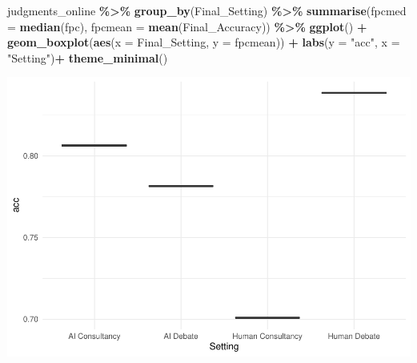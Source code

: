 \documentclass[
]{article}
\newenvironment{Shaded}{\begin{snugshade}}{\end{snugshade}}
\newcommand{\AttributeTok}[1]{\textcolor[rgb]{0.13,0.29,0.53}{#1}}
\newcommand{\FunctionTok}[1]{\textcolor[rgb]{0.13,0.29,0.53}{\textbf{#1}}}
\newcommand{\NormalTok}[1]{#1}
\newcommand{\SpecialCharTok}[1]{\textcolor[rgb]{0.81,0.36,0.00}{\textbf{#1}}}
\newcommand{\StringTok}[1]{\textcolor[rgb]{0.31,0.60,0.02}{#1}}
\begin{document}
\begin{Shaded}
\begin{Highlighting}[]
\NormalTok{judgments\_online }\SpecialCharTok{\%\textgreater{}\%}
  \FunctionTok{group\_by}\NormalTok{(Final\_Setting) }\SpecialCharTok{\%\textgreater{}\%} \FunctionTok{summarise}\NormalTok{(}\AttributeTok{fpcmed =} \FunctionTok{median}\NormalTok{(fpc),}
                                                           \AttributeTok{fpcmean =} \FunctionTok{mean}\NormalTok{(Final\_Accuracy)) }\SpecialCharTok{\%\textgreater{}\%}
  \FunctionTok{ggplot}\NormalTok{() }\SpecialCharTok{+}
  \FunctionTok{geom\_boxplot}\NormalTok{(}\FunctionTok{aes}\NormalTok{(}\AttributeTok{x =}\NormalTok{ Final\_Setting, }\AttributeTok{y =}\NormalTok{ fpcmean)) }\SpecialCharTok{+}
  \FunctionTok{labs}\NormalTok{(}\AttributeTok{y =} \StringTok{"acc"}\NormalTok{, }\AttributeTok{x =} \StringTok{"Setting"}\NormalTok{)}\SpecialCharTok{+}
  \FunctionTok{theme\_minimal}\NormalTok{()}
\end{Highlighting}
\end{Shaded}

\includegraphics{debate-2309_files/figure-latex/final probability correct-2.pdf}
\end{document}
